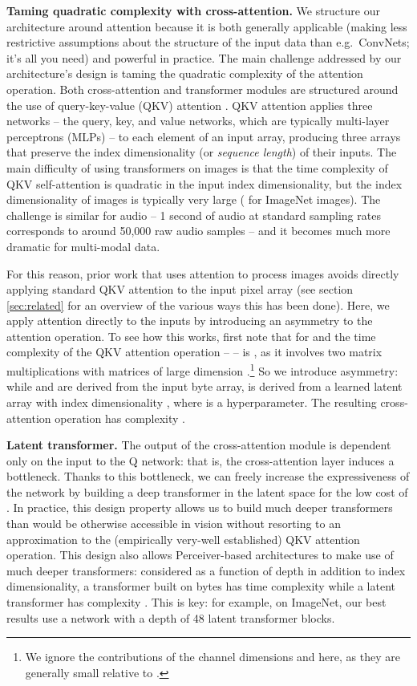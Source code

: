 \documentclass{article}
\begin{document}
\noindent \textbf{Taming quadratic complexity with cross-attention.} We structure our architecture around attention because it is both generally applicable (making less restrictive assumptions about the structure of the input data than e.g.\ ConvNets; it's all you need) and powerful in practice. The main challenge addressed by our architecture's design is taming the quadratic complexity of the attention operation. Both cross-attention and transformer modules are structured around the use of query-key-value (QKV) attention \cite{graves2014neural,weston2014memory,bahdanau2015neural}. QKV attention applies three networks -- the query, key, and value networks, which are typically multi-layer perceptrons (MLPs) -- to each element of an input array, producing three arrays that preserve the index dimensionality (or \textit{sequence length})  of their inputs. The main difficulty of using transformers on images is that the time complexity of QKV self-attention is quadratic in the input index dimensionality, but the index dimensionality of images is typically very large ( for  ImageNet images). The challenge is similar for audio -- 1 second of audio at standard sampling rates corresponds to around 50,000 raw audio samples -- and it becomes much more dramatic for multi-modal data.

For this reason, prior work that uses attention to process images avoids directly applying standard QKV attention to the input pixel array (see section \ref{sec:related} for an overview of the various ways this has been done). Here, we apply attention directly to the inputs by introducing an asymmetry to the attention operation. To see how this works, first note that for   and  the time complexity of the QKV attention operation --  -- is , as it involves two matrix multiplications with matrices of large dimension .\footnote{We ignore the contributions of the channel dimensions  and  here, as they are generally small relative to .} So we introduce asymmetry: while  and  are derived from the input byte array,  is derived from a learned latent array with index dimensionality , where  is a hyperparameter. The resulting cross-attention operation has complexity .

\noindent \textbf{Latent transformer.}
The output of the cross-attention module is dependent only on the input to the Q network: that is, the cross-attention layer induces a bottleneck. Thanks to this bottleneck, we can freely increase the expressiveness of the network by building a deep transformer in the latent space for the low cost of . In practice, this design property allows us to build much deeper transformers than would be otherwise accessible in vision without resorting to an approximation to the (empirically very-well established) QKV attention operation. This design also allows Perceiver-based architectures to make use of much deeper transformers: considered as a function of depth  in addition to index dimensionality, a transformer built on bytes has time complexity  while a latent transformer has complexity . This is key: for example, on ImageNet, our best results use a network with a depth of 48 latent transformer blocks.
\end{document}
